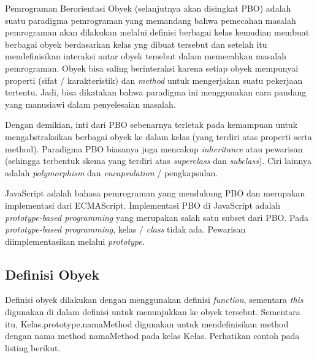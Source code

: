 Pemrograman Berorientasi Obyek (selanjutnya akan disingkat PBO) adalah suatu paradigma pemrograman yang memandang bahwa pemecahan masalah pemrograman akan dilakukan melalui definisi berbagai kelas kemudian membuat berbagai obyek berdasarkan kelas yng dibuat tersebut dan setelah itu mendefinisikan interaksi antar obyek tersebut dalam memecahkan masalah pemrograman. Obyek bisa saling berinteraksi karena setiap obyek mempunyai properti (sifat / karakteristik) dan \textit{method} untuk mengerjakan suatu pekerjaan tertentu. Jadi, bisa dikatakan bahwa paradigma ini menggunakan cara pandang yang manusiawi dalam penyelesaian masalah.

Dengan demikian, inti dari PBO sebenarnya terletak pada kemampuan untuk mengabstraksikan berbagai obyek ke dalam kelas (yang terdiri atas properti serta method). Paradigma PBO biasanya juga mencakup \textit{inheritance} atau pewarisan (sehingga terbentuk skema yang terdiri atas \textit{superclass} dan \textit{subclass}). Ciri lainnya adalah \textit{polymorphism} dan \textit{encapsulation} / pengkapsulan.

JavaScript adalah bahasa pemrograman yang mendukung PBO dan merupakan implementasi dari ECMAScript. Implementasi PBO di JavaScript adalah \textit{prototype-based programming} yang merupakan salah satu subset dari PBO. Pada \textit{prototype-based programming}, kelas / \textit{class} tidak ada. Pewarisan diimplementasikan melalui \textit{prototype}.

\subsection{Definisi Obyek}

Definisi obyek dilakukan dengan menggunakan definisi \textit{function}, sementara \textit{this} digunakan di dalam definisi untuk menunjukkan ke obyek tersebut. Sementara itu, Kelas.prototype.namaMethod digunakan untuk mendefinisikan method dengan nama method namaMethod pada kelas Kelas. Perhatikan contoh pada listing berikut.

